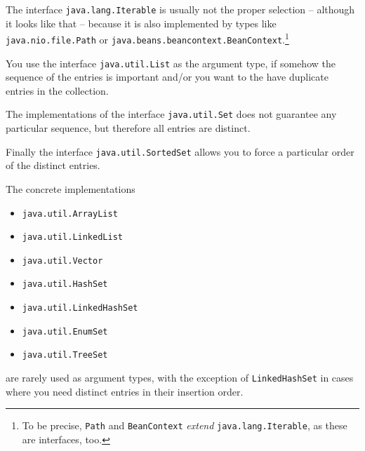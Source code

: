 \documentclass[11pt,a4paper, titlepage, parskip=half, headsepline, footsepline, cleardoublepage=current, headheight=1cm]{scrbook}
\begin{document}
The interface \lstinline|java.lang.Iterable|\autocite{ORACLE_DOC_ITERABLE_INTERFACE} is usually not the proper selection – although it looks like that – because it is also implemented by types like \lstinline|java.nio.file.Path|\autocite{ORACLE_DOC_PATH_INTERFACE} or \lstinline|java.beans.beancontext.BeanContext|\autocite{ORACLE_DOC_BEANCONTEXT_INTERFACE}.\footnote{To be precise, \lstinline|Path| and \lstinline|BeanContext| \textit{extend} \lstinline|java.lang.Iterable|, as these are interfaces, too.}

You use the interface \lstinline|java.util.List|\autocite{ORACLE_DOC_LIST_INTERFACE} as the argument type, if somehow the sequence of the entries is important and/or you want to the have duplicate entries in the collection.

The implementations of the interface \lstinline|java.util.Set|\autocite{ORACLE_DOC_SET_INTERFACE} does not guarantee any particular sequence, but therefore all entries are distinct.

Finally the interface \lstinline|java.util.SortedSet|\autocite{ORACLE_DOC_SORTEDSET_INTERFACE} allows you to force a particular order of the distinct entries.

The concrete implementations
\begin{itemize}[nosep]
\item{\lstinline|java.util.ArrayList|\autocite{ORACLE_DOC_ARRAYLIST_CLASS}}
\item{\lstinline|java.util.LinkedList|\autocite{ORACLE_DOC_LINKEDLIST_CLASS}}
\item{\lstinline|java.util.Vector|\autocite{ORACLE_DOC_VECTOR_CLASS}}
\item{\lstinline|java.util.HashSet|\autocite{ORACLE_DOC_HASHSET_CLASS}}
\item{\lstinline|java.util.LinkedHashSet|\autocite{ORACLE_DOC_LINKEDHASHSET_CLASS}}
\item{\lstinline|java.util.EnumSet|\autocite{ORACLE_DOC_ENUMSET_CLASS}}
\item{\lstinline|java.util.TreeSet|\autocite{ORACLE_DOC_TREESET_CLASS}}
\end{itemize}
are rarely used as argument types, with the exception of \lstinline|LinkedHashSet| in cases where you need distinct entries in their insertion order.
\end{document}
